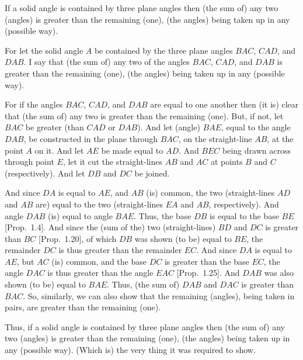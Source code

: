 \begin{Parallel}{}{}
{If a solid angle is contained by three plane angles
then (the sum of) any two (angles) is greater than the remaining (one), (the angles) being taken up in any (possible way).

\epsfysize=1.5in
\centerline{}

For let the solid angle $A$ be contained by the three plane angles $BAC$, $CAD$, and $DAB$. I say that (the sum of) any two of the angles $BAC$, $CAD$, and $DAB$ is greater than the remaining (one),
(the angles) being taken up in any (possible way).

For if the angles $BAC$, $CAD$, and $DAB$ are equal to one another
then (it is) clear that (the sum of) any two is greater than
the remaining (one). But, if not, let $BAC$ be greater (than $CAD$ or $DAB$). And let (angle) $BAE$, equal to the angle $DAB$,  be constructed in the plane through $BAC$, on the straight-line $AB$,
at the point $A$ on it. And let $AE$ be made equal to $AD$. And $BEC$
being drawn across through point $E$, let it cut the straight-lines $AB$
and $AC$ at points $B$ and $C$ (respectively). And let
$DB$ and $DC$ be joined.

And since $DA$ is equal to $AE$, and $AB$ (is) common, the
two (straight-lines $AD$ and $AB$ are) equal to the two (straight-lines
$EA$ and $AB$, respectively). And angle $DAB$ (is) equal
to angle $BAE$. Thus, the base $DB$ is equal to the base $BE$ [Prop.~1.4]. And since the
(sum of the) two (straight-lines) $BD$ and $DC$ is greater than $BC$
[Prop.~1.20], of which $DB$ was shown
(to be) equal to $BE$, the  remainder $DC$ is thus greater than the
remainder $EC$. And since $DA$ is equal to $AE$, but
$AC$ (is) common, and the base $DC$ is  greater than the base
$EC$, the angle $DAC$ is thus greater than the angle $EAC$
[Prop.~1.25]. And $DAB$
was also shown (to be) equal to $BAE$. Thus, 
(the sum of) $DAB$ and $DAC$ is greater than $BAC$. So,
similarly, we can also show that the remaining  (angles), being taken in pairs, are greater than the remaining (one).

Thus,  if a solid angle is contained by three plane angles
then (the sum of) any two (angles) is greater than the remaining (one), (the angles) being taken up in any (possible way). (Which is) the very thing it
was required to show.}
\end{Parallel}

